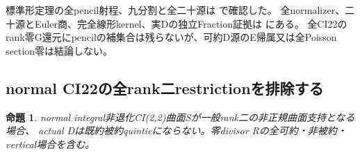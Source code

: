 \documentclass[a4paper,11pt]{ltjsarticle}
\newtheorem{proposition}{命題}[section]
\theoremstyle{definition}
\begin{document}
標準形定理の全pencil射程、九分割と全二十源は
で確認した。
全normalizer、二十源とEuler商、完全線形kernel、実Dの独立Fraction証拠は
にある。
全CI22のrank零G還元にpencilの補集合は残らないが、可約D源のE帰属又は全Poisson section零は結論しない。

\subsection{normal CI22の全rank二restrictionを排除する}
\begin{proposition}\label{prop:normal-CI22-ranktwo-all-empty}
normal integral非退化CI(2,2)曲面Sが一般rank二の非正規曲面支持となる場合、
actual Dは既約被約quinticにならない。零divisor Rの全可約・非被約・vertical場合を含む。
\end{proposition}
\end{document}
